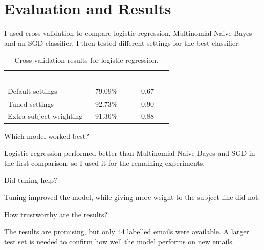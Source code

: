 \documentclass[conference]{IEEEtran}
\begin{document}
\section{Evaluation and Results}

I used cross-validation to compare logistic regression, Multinomial Naive Bayes and an SGD classifier. I then tested different settings for the best classifier.

\begin{table}[H]
\centering
\footnotesize
\setlength{\tabcolsep}{6pt}
\renewcommand{\arraystretch}{1.0}
\caption{Cross-validation results for logistic regression.}
\label{tab:results}
\begin{tabular}{@{}lcc@{}}
\toprule
\rowcolor{diagramblue}
\textcolor{white}{Settings} &
\textcolor{white}{Accuracy} &
\textcolor{white}{Macro F1} \\
\midrule
\rowcolor{diagramblue!5}
Default settings & 79.09\% & 0.67 \\
\rowcolor{diagramblue!12}
Tuned settings & 92.73\% & 0.90 \\
\rowcolor{diagramblue!5}
Extra subject weighting & 91.36\% & 0.88 \\
\bottomrule
\end{tabular}
\end{table}

Which model worked best?

Logistic regression performed better than Multinomial Naive Bayes and SGD in the first comparison, so I used it for the remaining experiments.

Did tuning help?

Tuning improved the model, while giving more weight to the subject line did not. 

How trustworthy are the results?

The results are promising, but only 44 labelled emails were available. A larger test set is needed to confirm how well the model performs on new emails.
\end{document}
